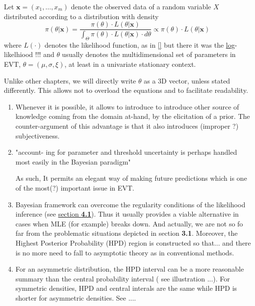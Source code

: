 \begin{definition}
	Let $\boldsymbol{x}=(x_1,\dots,x_m)$
	denote the observed data of a random variable $X$ distributed according to a distribution with density	
	\begin{equation}\label{bayeseq}
	\pi (\theta|\boldsymbol{x})=\frac{\pi(\theta)\cdot L(\theta|\boldsymbol{x})}{\int_{\Theta} 
		\pi(\theta)\cdot L(\theta|\boldsymbol{x}) \cdot d\theta}\propto \pi(\theta)\cdot 
	L(\theta|\boldsymbol{x})
	\end{equation}
	where $L(\cdot)$ denotes the likelihood function, as in \ref{} but there it was the \underline{log}-likelhiood !!!
	and $\theta$ usually denotes the multidimensional set of parameters in EVT, $\theta=(\mu,\sigma,\xi)$, at least in a univariate stationary context.
\end{definition}

Unlike other chapters, we will directly write $\theta$ as a 3D vector, unless stated differently. This allows not to overload the equations and to facilitate readability.
\begin{enumerate}
	
	\item Whenever it is possible, it allows to introduce to introduce other source of knowledge coming from the domain at-hand, by the elicitation of a prior.  The counter-argument of this advantage is that it also introduces (improper ?) subjectiveness.
	\item\label{it2bayes} "account-
	ing for parameter and threshold uncertainty is perhaps handled most easily in the
	Bayesian paradigm" \cite[pp.106]{dey_extreme_2016}
	
	As such, It permits an elegant way of making future predictions  which is one of the most(?) important issue in EVT.
	
	\item Bayesian framework can overcome the regularity conditions of the likelihood inference
	(see \hyperref[likintro]{section \textbf{4.1}}).
	Thus it usually provides a viable alternative in cases when MLE (for example) breaks down. And actually, we are not so fo far from the problematic situations depicted in section \textbf{3.1}. 
	Moreover, the Highest Posterior Probability (HPD) region is constructed so that... and there is no more need to fall to asymptotic theory as in conventional methods.
	
	
	\item For an asymmetric distribution,
	the HPD interval can be a more reasonable summary than the central probability
	interval ( see illustration ...). For symmetric densities, HPD and central interals are the same while HPD is shorter for asymmetric densities.
	See \citet{liu_simulation-efficient_2015}....
	
\end{enumerate}



